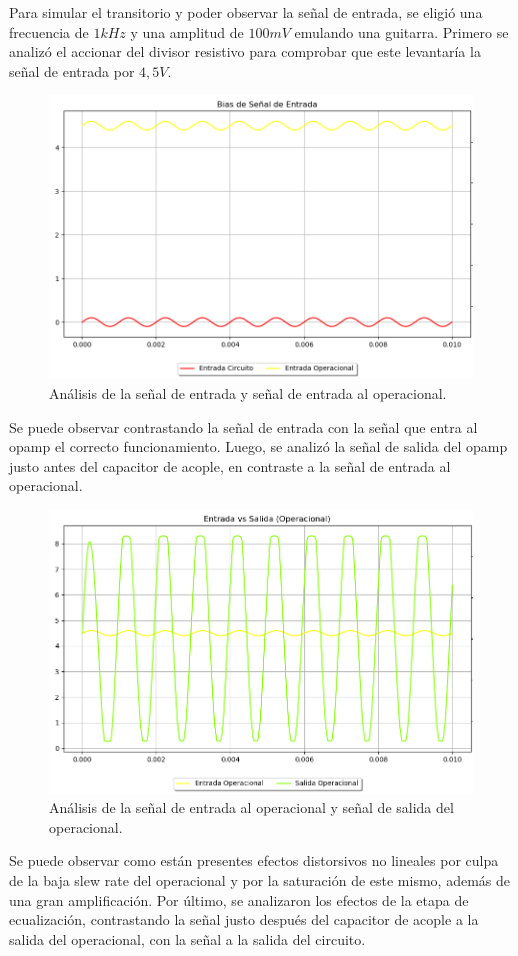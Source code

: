 Para simular el transitorio y poder observar la señal de entrada, se eligió una frecuencia de $1kHz$ y una amplitud de $100mV$ emulando una guitarra.
Primero se analizó el accionar del divisor resistivo para comprobar que este levantaría la señal de entrada por $4,5V$.
\begin{figure}[H]
	\centering
	\includegraphics[width=1\textwidth, trim={0 0 0 0}, clip]{Ejercicio5/Imagenes/Circuito_base/Sim/circuito_base_tran_vi_viop.png}
	\caption{Análisis de la señal de entrada y señal de entrada al operacional.}
	\label{fig:sim_base}
\end{figure}
Se puede observar contrastando la señal de entrada con la señal que entra al opamp el correcto funcionamiento.
Luego, se analizó la señal de salida del opamp justo antes del capacitor de acople, en contraste a la señal de entrada al operacional.
\begin{figure}[H]
	\centering
	\includegraphics[width=1\textwidth, trim={0 0 0 0}, clip]{Ejercicio5/Imagenes/Circuito_base/Sim/circuito_base_tran_viop_voop.png}
	\caption{Análisis de la señal de entrada al operacional y señal de salida del operacional. }
	\label{fig:sim_base}
\end{figure}
Se puede observar como están presentes efectos distorsivos no lineales por culpa de la baja slew rate del operacional y por la saturación de este mismo, además de una gran amplificación.
Por último, se analizaron los efectos de la etapa de ecualización, contrastando la señal justo después del capacitor de acople a la salida del operacional, con la señal a la salida del circuito.

